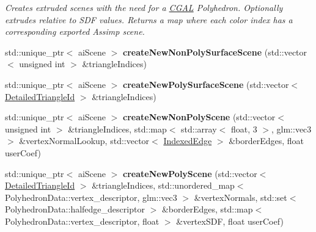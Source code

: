\begin{DoxyCompactItemize}
\begin{DoxyCompactList}\small\item\em Creates extruded scenes with the need for a \mbox{\hyperlink{namespace_c_g_a_l}{C\+G\+AL}} Polyhedron. Optionally extrudes relative to S\+DF values. Returns a map where each color index has a corresponding exported Assimp scene. \end{DoxyCompactList}\item 
\mbox{\label{classpepr3d_1_1_model_exporter_a007a46e5169890fa8ea5f87f2429e954}} 
std\+::unique\+\_\+ptr$<$ ai\+Scene $>$ {\bfseries create\+New\+Non\+Poly\+Surface\+Scene} (std\+::vector$<$ unsigned int $>$ \&triangle\+Indices)
\item 
\mbox{\label{classpepr3d_1_1_model_exporter_a33f988ccc16525698739ef2a84a4e215}} 
std\+::unique\+\_\+ptr$<$ ai\+Scene $>$ {\bfseries create\+New\+Poly\+Surface\+Scene} (std\+::vector$<$ \mbox{\hyperlink{structpepr3d_1_1_detailed_triangle_id}{Detailed\+Triangle\+Id}} $>$ \&triangle\+Indices)
\item 
\mbox{\label{classpepr3d_1_1_model_exporter_a17c20f94f6f130c249b6ab8aa7d36ea6}} 
std\+::unique\+\_\+ptr$<$ ai\+Scene $>$ {\bfseries create\+New\+Non\+Poly\+Scene} (std\+::vector$<$ unsigned int $>$ \&triangle\+Indices, std\+::map$<$ std\+::array$<$ float, 3 $>$, glm\+::vec3 $>$ \&vertex\+Normal\+Lookup, std\+::vector$<$ \mbox{\hyperlink{structpepr3d_1_1_model_exporter_1_1_indexed_edge}{Indexed\+Edge}} $>$ \&border\+Edges, float user\+Coef)
\item 
\mbox{\label{classpepr3d_1_1_model_exporter_ad79e95cf891b25f4b8b2e21451a3f321}} 
std\+::unique\+\_\+ptr$<$ ai\+Scene $>$ {\bfseries create\+New\+Poly\+Scene} (std\+::vector$<$ \mbox{\hyperlink{structpepr3d_1_1_detailed_triangle_id}{Detailed\+Triangle\+Id}} $>$ \&triangle\+Indices, std\+::unordered\+\_\+map$<$ Polyhedron\+Data\+::vertex\+\_\+descriptor, glm\+::vec3 $>$ \&vertex\+Normals, std\+::set$<$ Polyhedron\+Data\+::halfedge\+\_\+descriptor $>$ \&border\+Edges, std\+::map$<$ Polyhedron\+Data\+::vertex\+\_\+descriptor, float $>$ \&vertex\+S\+DF, float user\+Coef)
\end{DoxyCompactItemize}
